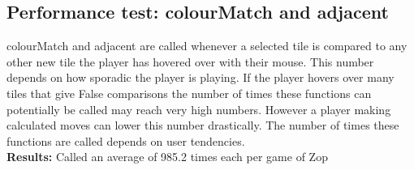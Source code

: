 \documentclass[12pt]{article}
\begin{document}
\subsection{Performance test: colourMatch and adjacent}
colourMatch and adjacent are called whenever a selected tile is compared to any other new tile the player has hovered over with their mouse.  This number depends on how sporadic the player is playing.  If the player hovers over many tiles that give False comparisons the number of times these functions can potentially be called may reach very high numbers.  However a player making calculated moves can lower this number drastically.  The number of times these functions are called depends on user tendencies.\\
\textbf{Results: } Called an average of 985.2 times each per game of Zop
\end{document}
